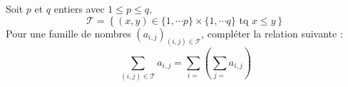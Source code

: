 Soit $p$ et $q$ entiers avec $1\leq p \leq q$,
\begin{displaymath}
 \mathcal T = \left\lbrace (x,y)\in \{1,\cdots p\}\times\{1,\cdots q\}\text{ tq } x\leq y \right\rbrace 
\end{displaymath}
Pour une famille de nombres $(a_{i,j})_{(i,j)\in \mathcal T}$, compl\'eter la relation suivante :
\begin{displaymath}
  \sum_{(i,j)\in \mathcal T}a_{i,j}=\sum_{i=}\left( \sum_{j=} a_{i,j}\right)
\end{displaymath}
